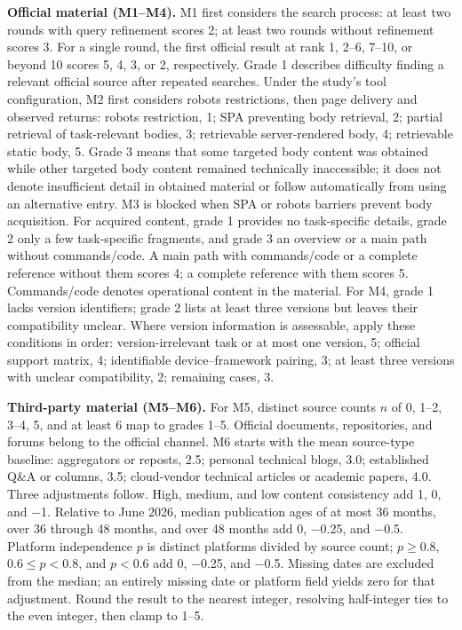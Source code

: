 \documentclass[manuscript,review,anonymous]{acmart}
\begin{document}
\textbf{Official material (M1--M4).} M1 first considers the search process: at least two rounds with query refinement scores 2; at least two rounds without refinement scores 3. For a single round, the first official result at rank 1, 2--6, 7--10, or beyond 10 scores 5, 4, 3, or 2, respectively. Grade 1 describes difficulty finding a relevant official source after repeated searches. Under the study's tool configuration, M2 first considers robots restrictions, then page delivery and observed returns: robots restriction, 1; SPA preventing body retrieval, 2; partial retrieval of task-relevant bodies, 3; retrievable server-rendered body, 4; retrievable static body, 5. Grade 3 means that some targeted body content was obtained while other targeted body content remained technically inaccessible; it does not denote insufficient detail in obtained material or follow automatically from using an alternative entry. M3 is blocked when SPA or robots barriers prevent body acquisition. For acquired content, grade 1 provides no task-specific details, grade 2 only a few task-specific fragments, and grade 3 an overview or a main path without commands/code. A main path with commands/code or a complete reference without them scores 4; a complete reference with them scores 5. Commands/code denotes operational content in the material. For M4, grade 1 lacks version identifiers; grade 2 lists at least three versions but leaves their compatibility unclear. Where version information is assessable, apply these conditions in order: version-irrelevant task or at most one version, 5; official support matrix, 4; identifiable device--framework pairing, 3; at least three versions with unclear compatibility, 2; remaining cases, 3.

\textbf{Third-party material (M5--M6).} For M5, distinct source counts \(n\) of 0, 1--2, 3--4, 5, and at least 6 map to grades 1--5. Official documents, repositories, and forums belong to the official channel. M6 starts with the mean source-type baseline: aggregators or reposts, 2.5; personal technical blogs, 3.0; established Q\&A or columns, 3.5; cloud-vendor technical articles or academic papers, 4.0. Three adjustments follow. High, medium, and low content consistency add 1, 0, and −1. Relative to June 2026, median publication ages of at most 36 months, over 36 through 48 months, and over 48 months add 0, −0.25, and −0.5. Platform independence \(p\) is distinct platforms divided by source count; \(p\geq 0.8\), \(0.6\leq  p<0.8\), and \(p<0.6\) add 0, −0.25, and −0.5. Missing dates are excluded from the median; an entirely missing date or platform field yields zero for that adjustment. Round the result to the nearest integer, resolving half-integer ties to the even integer, then clamp to 1--5.
\end{document}
